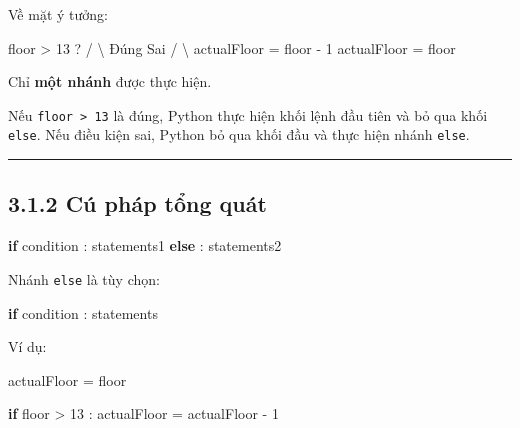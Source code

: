 \documentclass[
  11pt,
  a4paper,
]{article}
\newenvironment{Shaded}{}{}
\newcommand{\ControlFlowTok}[1]{\textcolor[rgb]{0.00,0.44,0.13}{\textbf{#1}}}
\newcommand{\DecValTok}[1]{\textcolor[rgb]{0.25,0.63,0.44}{#1}}
\newcommand{\NormalTok}[1]{#1}
\newcommand{\OperatorTok}[1]{\textcolor[rgb]{0.40,0.40,0.40}{#1}}
\begin{document}
Về mặt ý tưởng:

\begin{Shaded}
\begin{Highlighting}[]
\NormalTok{                 floor \textgreater{} 13 ?}
\NormalTok{                  /       \textbackslash{}}
\NormalTok{              Đúng        Sai}
\NormalTok{               /            \textbackslash{}}
\NormalTok{ actualFloor = floor {-} 1   actualFloor = floor}
\end{Highlighting}
\end{Shaded}

Chỉ \textbf{một nhánh} được thực hiện.

Nếu \texttt{floor\ \textgreater{}\ 13} là đúng, Python thực hiện khối
lệnh đầu tiên và bỏ qua khối \texttt{else}. Nếu điều kiện sai, Python bỏ
qua khối đầu và thực hiện nhánh \texttt{else}.

\begin{center}\rule{0.5\linewidth}{0.5pt}\end{center}

\subsection{3.1.2 Cú pháp tổng
quát}\label{cuxfa-phuxe1p-tux1ed5ng-quuxe1t}

\begin{Shaded}
\begin{Highlighting}[]
\ControlFlowTok{if}\NormalTok{ condition :}
\NormalTok{    statements1}
\ControlFlowTok{else}\NormalTok{ :}
\NormalTok{    statements2}
\end{Highlighting}
\end{Shaded}

Nhánh \texttt{else} là tùy chọn:

\begin{Shaded}
\begin{Highlighting}[]
\ControlFlowTok{if}\NormalTok{ condition :}
\NormalTok{    statements}
\end{Highlighting}
\end{Shaded}

Ví dụ:

\begin{Shaded}
\begin{Highlighting}[]
\NormalTok{actualFloor }\OperatorTok{=}\NormalTok{ floor}

\ControlFlowTok{if}\NormalTok{ floor }\OperatorTok{\textgreater{}} \DecValTok{13}\NormalTok{ :}
\NormalTok{    actualFloor }\OperatorTok{=}\NormalTok{ actualFloor }\OperatorTok{{-}} \DecValTok{1}
\end{Highlighting}
\end{Shaded}
\end{document}
